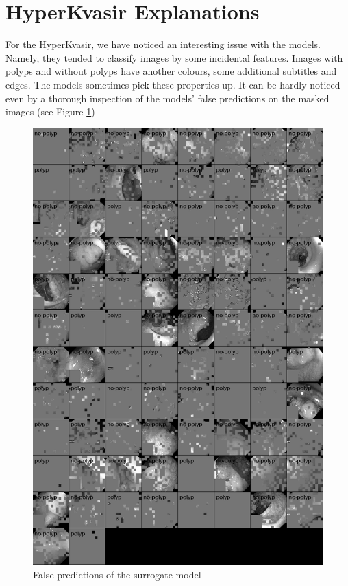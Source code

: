 \documentclass[magisterska,en]{pracamgr}
\begin{document}
\section{HyperKvasir Explanations}\label{s:HyperKvasir Explanations}

For the HyperKvasir, we have noticed an interesting issue with the models. Namely, they tended to classify images by some incidental features. Images with polyps and without polyps have another colours, some additional subtitles and edges. The models sometimes pick these properties up. It can be hardly noticed even by a thorough inspection of the models' false predictions on the masked images (see Figure \ref{gastro_vit_masked}) 

\begin{figure}[H]
\centering
\includegraphics[scale=0.4]{./images/gastro_false_surrogate.png}
\caption{False predictions of the surrogate model}
\label{gastro_vit_masked}
\end{figure}
\end{document}
